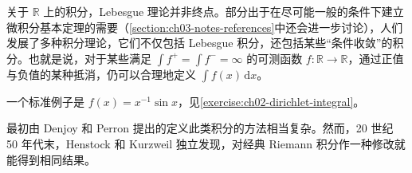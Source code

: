 \documentclass[../../main.tex]{subfiles}%
\begin{document}
关于 $\mathbb{R}$ 上的积分，Lebesgue 理论并非终点。部分出于在尽可能一般的条件下建立微积分基本定理的需要（\cref{section:ch03-notes-references}中还会进一步讨论），人们发展了多种积分理论，它们不仅包括 Lebesgue 积分，还包括某些“条件收敛”的积分。也就是说，对于某些满足 $\int f^+=\int f^-=\infty$ 的可测函数 $f:\mathbb{R}\to\mathbb{R}$，通过正值与负值的某种抵消，仍可以合理地定义 $\int f(x)\,\mathrm{d}x$。
\begin{example}\label{example:ch02-conditionally-convergent-integral}
一个标准例子是 $f(x)=x^{-1}\sin x$，见\cref{exercise:ch02-dirichlet-integral}。
\end{example}
最初由 Denjoy 和 Perron 提出的定义此类积分的方法相当复杂。然而，20 世纪 50 年代末，Henstock 和 Kurzweil 独立发现，对经典 Riemann 积分作一种修改就能得到相同结果。
\end{document}
